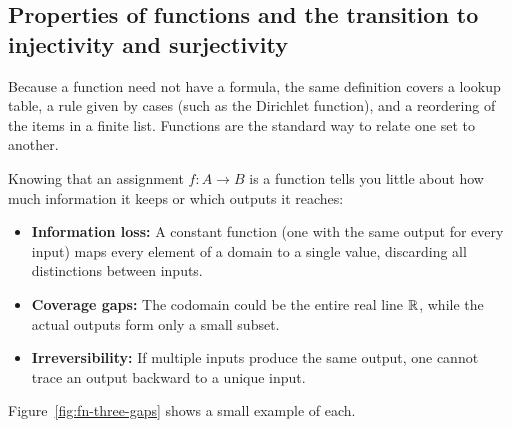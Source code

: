 \subsection{Properties of functions and the transition to injectivity and surjectivity}

Because a function need not have a formula, the same definition covers a lookup table, a rule given by cases (such as the Dirichlet function), and a reordering of the items in a finite list. Functions are the standard way to relate one set to another.

Knowing that an assignment $f: A \to B$ is a function tells you little about how much information it keeps or which outputs it reaches:
\begin{itemize}
\item \textbf{Information loss:} A constant function (one with the same output for every input) maps every element of a domain to a single value, discarding all distinctions between inputs.
\item \textbf{Coverage gaps:} The codomain could be the entire real line $\mathbb{R}$, while the actual outputs form only a small subset.
\item \textbf{Irreversibility:} If multiple inputs produce the same output, one cannot trace an output backward to a unique input.
\end{itemize}
Figure~\ref{fig:fn-three-gaps} shows a small example of each.

